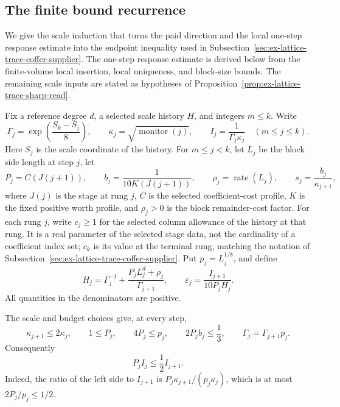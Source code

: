 \subsection{The finite bound recurrence}
\label{sec:ex-lattice-trace-price-recurrence}

We give the scale induction that turns the paid direction and the local
one-step response estimate into the endpoint inequality used in
Subsection~\ref{sec:ex-lattice-trace-coffer-supplier}. The one-step response
estimate is derived below from the finite-volume local insertion, local
uniqueness, and block-size bounds. The remaining scale inputs are stated
as hypotheses of Proposition~\ref{prop:ex-lattice-trace-sharp-read}.

Fix a reference degree \(d\), a selected scale history \(H\), and integers
\(m\leq k\). Write
\[
 \Gamma_j=\exp\!\left(\frac{S_k-S_j}{8}\right),\qquad
 \kappa_j=\sqrt{\operatorname{monitor}(j)},\qquad
 I_j=\frac1{\Gamma_j\kappa_j}\quad(m\leq j\leq k).
\]
Here \(S_j\) is the scale coordinate of the history. For \(m\leq j<k\),
let \(L_j\) be the block side length at step \(j\), let
\[
 P_j=C(J(j+1)),\qquad
 b_j=\frac1{10K(J(j+1))},\qquad
 \rho_j=\operatorname{rate}(L_j),\qquad
 s_j=\frac{b_j}{\kappa_{j+1}},
\]
where \(J(j)\) is the stage at rung \(j\), \(C\) is the selected
coefficient-cost profile, \(K\) is the fixed positive worth profile, and
\(\rho_j>0\) is the block remainder-cost factor. For each rung \(j\), write \(c_j\geq1\) for the selected column allowance of the history at that rung. It is a real parameter of the selected stage data, not the cardinality of a coefficient index set; \(c_k\) is its value at the terminal
rung, matching the notation of Subsection~\ref{sec:ex-lattice-trace-coffer-supplier}. Put \(p_j=L_j^{1/8}\), and define
\begin{equation}
 H_j=\Gamma_j^{-1}+\frac{P_jL_j^d+\rho_j}{\Gamma_{j+1}},\qquad
 \varepsilon_j=\frac{I_{j+1}}{10P_jH_j}.
 \label{eq:ex-lattice-price-local-scales}
\end{equation}
All quantities in the denominators are positive.

The scale and budget choices give, at every step,
\begin{equation}
 \kappa_{j+1}\leq2\kappa_j,\qquad
 1\leq P_j,\qquad 4P_j\leq p_j,\qquad
 2P_jb_j\leq\frac13,\qquad
 \Gamma_j=\Gamma_{j+1}p_j.
 \label{eq:ex-lattice-price-budget}
\end{equation}
Consequently
\begin{equation}
 P_jI_j\leq\frac12 I_{j+1}.
 \label{eq:ex-lattice-price-contraction}
\end{equation}
Indeed, the ratio of the left side to \(I_{j+1}\) is
\(P_j\kappa_{j+1}/(p_j\kappa_j)\), which is at most \(2P_j/p_j\leq1/2\).

